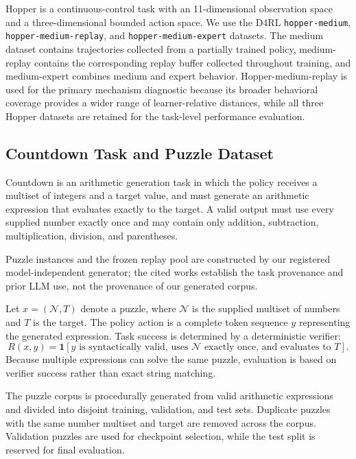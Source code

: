 \documentclass{article}
\theoremstyle{plain}
\theoremstyle{definition}
\theoremstyle{remark}
\begin{document}
Hopper is a continuous-control task with an
11-dimensional observation space and a three-dimensional bounded action
space. We use the D4RL
\texttt{hopper-medium},
\texttt{hopper-medium-replay}, and
\texttt{hopper-medium-expert}
datasets. The medium dataset contains trajectories collected from a
partially trained policy, medium-replay contains the corresponding replay
buffer collected throughout training, and medium-expert combines medium
and expert behavior. Hopper-medium-replay is used for the primary mechanism
diagnostic because its broader behavioral coverage provides a wider range of
learner-relative distances, while all three Hopper datasets are retained for
the task-level performance evaluation.

\subsection{Countdown Task and Puzzle Dataset}
\label{app:countdown_dataset}

Countdown is an arithmetic generation task in which the policy receives
a multiset of integers and a target value, and must generate an
arithmetic expression that evaluates exactly to the target. A valid
output must use every supplied number exactly once and may contain only
addition, subtraction, multiplication, division, and parentheses.

Puzzle instances and the frozen replay pool are constructed by our
registered model-independent generator; the cited works establish
the task provenance and prior LLM use, not the provenance of our
generated corpus.

Let
$x=(\mathcal N,T)$
denote a puzzle, where
$\mathcal N$
is the supplied multiset of numbers and
$T$
is the target. The policy action is a complete token sequence
$y$ representing the generated expression. Task success is determined
by a deterministic verifier:
\begin{equation}
    R(x,y)
    =
    \mathbf 1
    \left[
        y
        \text{ is syntactically valid, uses }
        \mathcal N
        \text{ exactly once, and evaluates to }T
    \right].
    \label{eq:countdown_reward}
\end{equation}
Because multiple expressions can solve the same puzzle, evaluation is
based on verifier success rather than exact string matching.

The puzzle corpus is procedurally generated from valid arithmetic
expressions and divided into disjoint training, validation, and test
sets. Duplicate puzzles with the same number multiset and target are
removed across the corpus. Validation puzzles are used for checkpoint
selection, while the test split is reserved for final evaluation.
\end{document}
